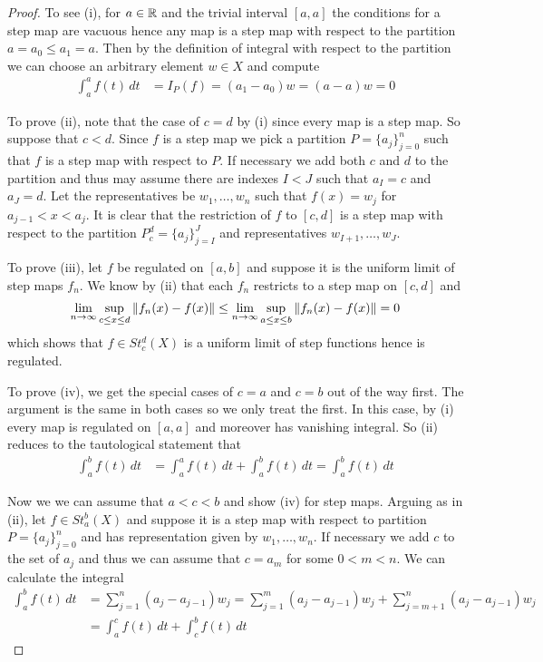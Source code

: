 \begin{proof}
  To see (i), for $a \in \mathbb{R}$ and the trivial interval $[a,a]$ the conditions for a step map are vacuous hence any map is a step map with respect to the partition $a = a_0 \leq a_1 = a$.   Then by the definition of integral with respect to the partition we can choose an arbitrary element $w \in X$ and compute
  \begin{align*}
    \int_a^a f(t) \, dt &= I_P(f) = (a_1 - a_0) w = (a - a) w = 0
  \end{align*}
  
  To prove (ii), note that the case of $c=d$ by (i) since every map is a step map.   So suppose that $c < d$.  Since $f$ is a step map we pick a partition $P=\lbrace a_j \rbrace_{j=0}^n$ such that $f$ is a step map with respect to $P$.   If necessary we add both $c$ and $d$ to the partition and thus may assume there are indexes $I< J$ such that $a_I = c$ and $a_J = d$.   Let the representatives be $w_1, \dots, w_n$ such that $f(x) = w_j$ for $a_{j-1} < x < a_j$.   It is clear that the restriction of $f$ to $[c,d]$ is a step map with respect to the partition $P_c^d = \lbrace a_j \rbrace_{j=I}^J$ and representatives $w_{I+1}, \dotsc, w_J$.  

  To prove (iii),  let $f$ be regulated on $[a,b]$ and suppose it is the uniform limit of step maps $f_n$.  We know by (ii) that each $f_n$ restricts to a step map on $[c,d]$ and
  \begin{align*}
    \lim_{n \to \infty} \sup_{c \leq x \leq d} \left \lVert f_n(x) - f(x) \right \rVert \leq \lim_{n \to \infty} \sup_{a \leq x \leq b} \left \lVert f_n(x) - f(x) \right \rVert = 0
  \end{align*}
  which shows that $f \in St_c^d(X)$ is a uniform limit of step functions hence is regulated.


To prove (iv), we get the special cases of $c=a$ and $c = b$  out of the way first.   The argument is the same in both cases so we only treat the first.  In this case, by (i) every map is regulated on $[a,a]$ and moreover has vanishing integral.  So (ii) reduces to the tautological statement that
\begin{align*}
\int_a^b f(t) \, dt &= \int_a^a f(t) \, dt + \int_a^b f(t) \, dt = \int_a^b f(t) \, dt
\end{align*}

Now we we can assume that $a < c < b$ and show (iv) for step maps.   Arguing as in (ii), let $f \in St_a^b(X)$ and suppose it is a step map with respect to partition $P =\lbrace a_j \rbrace_{j=0}^n$ and has representation given by $w_1, \dotsc, w_n$.   If necessary we
  add $c$ to the set of $a_j$ and thus we can assume that $c = a_m$ for some $0 < m < n$.   We can calculate the integral
  \begin{align*}
    \int_a^b f(t) \, dt &= \sum^n_{j=1} (a_j - a_{j-1}) w_j = \sum^m_{j=1} (a_j - a_{j-1}) w_j + \sum^n_{j=m+1} (a_j - a_{j-1}) w_j \\
    &= \int_a^c f(t) \, dt  + \int_c^b f(t) \, dt 
  \end{align*}


\end{proof}
